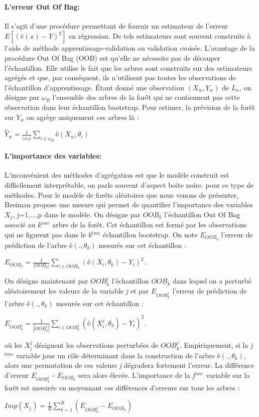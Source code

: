 \paragraph{L'erreur Out Of Bag:}
	Il s'agit d'une procédure permettant de fournir un estimateur de l'erreur ${E[(\hat{e}(x)-Y)^2]}$ en régression. De tels estimateurs sont souvent construits à l'aide de méthode apprentissage-validation ou validation croisée. L'avantage de la procédure Out Of Bag (OOB) est qu'elle ne nécessite pas de découper
	l'échantillon. Elle utilise le fait que les arbres sont construits sur des estimateurs agrégés et que,
	par conséquent, ils n'utilisent pas toutes les observations de l'échantillon d'apprentissage. Étant donné une observation ${(X_w,Y_w)}$ de $L_n$, on désigne par ${\omega_B}$ l'ensemble des arbres de la forêt qui
	ne contiennent pas cette observation dans leur échantillon bootstrap. Pour estimer, la prévision de
	la forêt sur ${Y_w}$ on agrège uniquement ces arbres là :
	\begin{center}
	$\hat{Y}_w = \frac{1}{|\omega_B|} \sum_{i \in \omega_B} ê(X_w,\theta_i)$
	\end{center}
\paragraph{L'importance des variables:}
	L'inconvénient des méthodes d'agrégation est que le modèle construit est difficilement interprétable, on parle souvent d'aspect boite noire.
	pour ce type de méthodes. Pour le modèle de forêts aléatoires que nous venons de présenter,
	Breiman\cite{BREI01} propose une mesure qui permet de quantifier l'importance des variables $X_j$, j=1,...,p dans le modèle.
	On désigne par $OOB_k$ l'échantillon Out Of Bag associé au \textit{k}$^{ème}$ arbre de la forêt. Cet échantillon est formé par les observations qui ne figurent pas dans le \textit{k}$^{ème}$ échantillon bootstrap. On note $E_{OOB_k}$ l'erreur de prédiction de l'arbre $ê(.,\theta_k)$ mesurée sur cet échantillon :
	\begin{center}
	$E_{OOB_k} = \frac{1}{|OOB_k|} \sum_{i \in OOB_k} (ê(X_i,\theta_k) -Y_i)^2.$
	\end{center}
	On désigne maintenant par $OOB_{k}^{j}$ l'échantillon $OOB_k$ dans lequel on a perturbé aléatoirement
	les valeurs de la variable \textit{j} et par $E_{OOB_{k}^{j}}$ l'erreur de prédiction de l'arbre $ê(.,\theta_k)$ mesurée sur cet échantillon :
	\begin{center}
		$E_{OOB_{k}^{j}} = \frac{1}{|OOB_{k}^{j}|} \sum_{i \in OOB_{k}^{j}} (ê(X_{i}^{j},\theta_k) -Y_i)^2.$
	\end{center}	
	où les $X_{i}^{j}$ désignent les observations perturbées de $OOB_{k}^{j}$. Empiriquement, si la \textit{j}$^{ème}$ variable joue un rôle déterminant dans la construction de l'arbre $ê(.,\theta_k)$, alors une permutation de ces valeurs \textit{j} dégradera fortement l'erreur. La différence d'erreur $E_{OOB_{k}^{j}}$ - $E_{OOB_k}$ sera alors élevée. L'importance de la \textit{j}$^{ème}$ variable sur la forêt est mesurée en moyennant ces différences d'erreurs sur tous les arbres :
	\begin{center}
	${Imp(X_j) = \frac{1}{B} \sum_{k=1}^{B} (E_{OOB_{k}^{j}} - E_{OOB_k}) }$
	\end{center}
	

